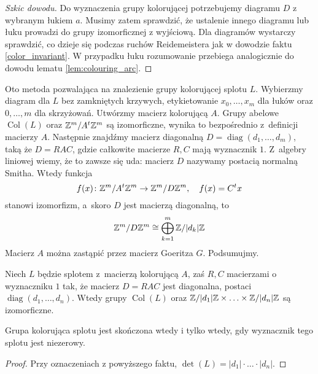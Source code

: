 \begin{proof}[Szkic dowodu]
    Do wyznaczenia grupy kolorującej potrzebujemy diagramu $D$ z wybranym łukiem $a$.
    Musimy zatem sprawdzić, że ustalenie innego diagramu lub łuku prowadzi do grupy izomorficznej z wyjściową.
    Dla diagramów wystarczy sprawdzić, co dzieje się podczas ruchów Reidemeistera jak w dowodzie faktu \ref{color_invariant}.
    W przypadku łuku rozumowanie przebiega analogicznie do dowodu lematu \ref{lem:colouring_arc}.
\end{proof}

Oto metoda pozwalająca na znalezienie grupy kolorującej splotu $L$.
Wybierzmy diagram dla $L$ bez zamkniętych krzywych, etykietowanie $x_0, \ldots, x_m$ dla łuków oraz $0, \ldots, m$ dla skrzyżowań.
Utwórzmy macierz kolorującą $A$.
Grupy abelowe $\operatorname{Col}(L)$ oraz $\mathbb Z^m / A^t \mathbb Z^m$ są izomorficzne, wynika to bezpośrednio z~definicji macierzy $A$.
Następnie znajdźmy macierz diagonalną $D = \operatorname{diag}(d_1, \ldots, d_m)$, taką że $D = RAC$, gdzie całkowite macierze $R, C$ mają wyznacznik $1$.
Z~algebry liniowej wiemy, że to zawsze się uda: macierz $D$ nazywamy postacią normalną Smitha.
Wtedy funkcja
\begin{equation}
    f(x) \colon \mathbb Z^m/A^t \mathbb Z^m \to \mathbb Z^m / D\mathbb Z^m, \quad f(x) = C^t x
\end{equation}
stanowi izomorfizm, a~skoro $D$ jest macierzą diagonalną, to 
\begin{equation}
    \mathbb Z^m/D\mathbb Z^m \cong \bigoplus_{k=1}^m \mathbb Z/{|d_k|} \mathbb Z
\end{equation}
Macierz $A$ można zastąpić przez macierz Goeritza $G$.
Podsumujmy.

\begin{proposition}
    Niech $L$ będzie splotem z~macierzą kolorującą $A$, zaś $R, C$ macierzami o wyznaczniku $1$ tak, że macierz $D=RAC$ jest diagonalna, postaci $\operatorname{diag}(d_1, \ldots, d_n)$.
    Wtedy grupy $\operatorname{Col}(L)$ oraz $\mathbb Z/|d_1| \mathbb Z \times \ldots \times \mathbb Z/|d_n| \mathbb Z$ są izomorficzne.
\end{proposition}

\begin{corollary}
    Grupa kolorująca splotu jest skończona wtedy i tylko wtedy, gdy wyznacznik tego splotu jest niezerowy.
\end{corollary}

\begin{proof}
    Przy oznaczeniach z powyższego faktu, $\det(L) = |d_1| \cdot \ldots \cdot |d_n|$.
\end{proof}

